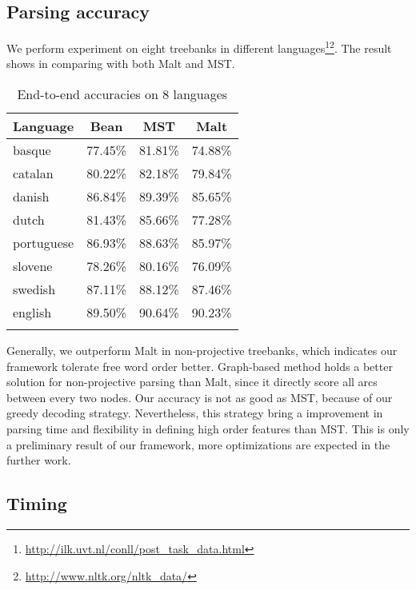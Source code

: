 \subsection{Parsing accuracy}
We perform experiment on eight treebanks in different languages\footnote{\url{http://ilk.uvt.nl/conll/post_task_data.html}}\footnote{\url{http://www.nltk.org/nltk_data/}}.
The result shows in  comparing with both Malt and MST.
\begin{table}[htbp]
    \centering
    \caption{End-to-end accuracies on 8 languages}
    \begin{tabular}{l|ccc}
        \whline
        Language & Bean & MST & Malt \\
        \hline
        basque & 77.45\% & 81.81\% & 74.88\% \\
        catalan & 80.22\% & 82.18\% & 79.84\% \\
        danish & 86.84\% & 89.39\% & 85.65\% \\
        dutch & 81.43\% & 85.66\% & 77.28\% \\
        portuguese & 86.93\% & 88.63\% & 85.97\% \\
        slovene & 78.26\% & 80.16\% & 76.09\% \\
        swedish & 87.11\% & 88.12\% & 87.46\% \\
        english & 89.50\% & 90.64\% & 90.23\% \\
        \whline
    \end{tabular}%
    \label{tab:multilingual test}%
\end{table}%
Generally, we outperform Malt in non-projective treebanks, which indicates our framework tolerate free word order better. Graph-based method holds a better solution for non-projective parsing than Malt, since it directly score all arcs between every two nodes. Our accuracy is not as good as MST, because of our greedy decoding strategy.
Nevertheless, this strategy bring a improvement in parsing time and flexibility in defining high order features than MST.
This is only a preliminary result of our framework, more optimizations are expected in the further work.

\subsection{Timing}

